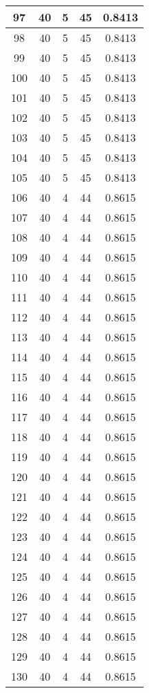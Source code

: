 \documentclass[letterpaper, 12pt]{article}
\begin{document}
\begin{longtable}{|c|c|c|c|c|}
\hline
97 & 40 & 5 & 45 & 0.8413 \\
\hline
98 & 40 & 5 & 45 & 0.8413 \\
\hline
99 & 40 & 5 & 45 & 0.8413 \\
\hline
100 & 40 & 5 & 45 & 0.8413 \\
\hline
101 & 40 & 5 & 45 & 0.8413 \\
\hline
102 & 40 & 5 & 45 & 0.8413 \\
\hline
103 & 40 & 5 & 45 & 0.8413 \\
\hline
104 & 40 & 5 & 45 & 0.8413 \\
\hline
105 & 40 & 5 & 45 & 0.8413 \\
\hline
106 & 40 & 4 & 44 & 0.8615 \\
\hline
107 & 40 & 4 & 44 & 0.8615 \\
\hline
108 & 40 & 4 & 44 & 0.8615 \\
\hline
109 & 40 & 4 & 44 & 0.8615 \\
\hline
110 & 40 & 4 & 44 & 0.8615 \\
\hline
111 & 40 & 4 & 44 & 0.8615 \\
\hline
112 & 40 & 4 & 44 & 0.8615 \\
\hline
113 & 40 & 4 & 44 & 0.8615 \\
\hline
114 & 40 & 4 & 44 & 0.8615 \\
\hline
115 & 40 & 4 & 44 & 0.8615 \\
\hline
116 & 40 & 4 & 44 & 0.8615 \\
\hline
117 & 40 & 4 & 44 & 0.8615 \\
\hline
118 & 40 & 4 & 44 & 0.8615 \\
\hline
119 & 40 & 4 & 44 & 0.8615 \\
\hline
120 & 40 & 4 & 44 & 0.8615 \\
\hline
121 & 40 & 4 & 44 & 0.8615 \\
\hline
122 & 40 & 4 & 44 & 0.8615 \\
\hline
123 & 40 & 4 & 44 & 0.8615 \\
\hline
124 & 40 & 4 & 44 & 0.8615 \\
\hline
125 & 40 & 4 & 44 & 0.8615 \\
\hline
126 & 40 & 4 & 44 & 0.8615 \\
\hline
127 & 40 & 4 & 44 & 0.8615 \\
\hline
128 & 40 & 4 & 44 & 0.8615 \\
\hline
129 & 40 & 4 & 44 & 0.8615 \\
\hline
130 & 40 & 4 & 44 & 0.8615 \\

\end{longtable}
\end{document}
